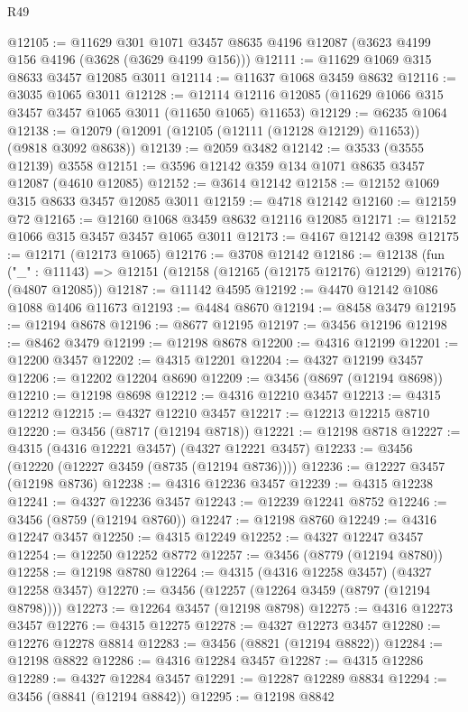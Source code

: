 \begin{lexlean}{R49}
\begin{coremodule}
@12105 := @11629
    @301
    @1071
    @3457
    @8635
    @4196
    @12087
    (@3623 @4199 @156 @4196 (@3628 (@3629 @4199 @156)))
@12111 := @11629 @1069 @315 @8633 @3457 @12085 @3011
@12114 := @11637 @1068 @3459 @8632
@12116 := @3035 @1065 @3011
@12128 := @12114 @12116 @12085 (@11629 @1066 @315 @3457 @3457 @1065 @3011 (@11650 @1065) @11653)
@12129 := @6235 @1064
@12138 := @12079 (@12091 (@12105 (@12111 (@12128 @12129) @11653)) (@9818 @3092 @8638))
@12139 := @2059 @3482
@12142 := @3533 (@3555 @12139) @3558
@12151 := @3596 @12142 @359 @134 @1071 @8635 @3457 @12087 (@4610 @12085)
@12152 := @3614 @12142
@12158 := @12152 @1069 @315 @8633 @3457 @12085 @3011
@12159 := @4718 @12142
@12160 := @12159 @72
@12165 := @12160 @1068 @3459 @8632 @12116 @12085
@12171 := @12152 @1066 @315 @3457 @3457 @1065 @3011
@12173 := @4167 @12142 @398
@12175 := @12171 (@12173 @1065)
@12176 := @3708 @12142
@12186 := @12138
    (fun ("_" : @11143) => @12151 (@12158 (@12165 (@12175 @12176) @12129) @12176) (@4807 @12085))
@12187 := @11142 @4595
@12192 := @4470 @12142 @1086 @1088 @1406 @11673
@12193 := @4484 @8670
@12194 := @8458 @3479
@12195 := @12194 @8678
@12196 := @8677 @12195
@12197 := @3456 @12196
@12198 := @8462 @3479
@12199 := @12198 @8678
@12200 := @4316 @12199
@12201 := @12200 @3457
@12202 := @4315 @12201
@12204 := @4327 @12199 @3457
@12206 := @12202 @12204 @8690
@12209 := @3456 (@8697 (@12194 @8698))
@12210 := @12198 @8698
@12212 := @4316 @12210 @3457
@12213 := @4315 @12212
@12215 := @4327 @12210 @3457
@12217 := @12213 @12215 @8710
@12220 := @3456 (@8717 (@12194 @8718))
@12221 := @12198 @8718
@12227 := @4315 (@4316 @12221 @3457) (@4327 @12221 @3457)
@12233 := @3456 (@12220 (@12227 @3459 (@8735 (@12194 @8736))))
@12236 := @12227 @3457 (@12198 @8736)
@12238 := @4316 @12236 @3457
@12239 := @4315 @12238
@12241 := @4327 @12236 @3457
@12243 := @12239 @12241 @8752
@12246 := @3456 (@8759 (@12194 @8760))
@12247 := @12198 @8760
@12249 := @4316 @12247 @3457
@12250 := @4315 @12249
@12252 := @4327 @12247 @3457
@12254 := @12250 @12252 @8772
@12257 := @3456 (@8779 (@12194 @8780))
@12258 := @12198 @8780
@12264 := @4315 (@4316 @12258 @3457) (@4327 @12258 @3457)
@12270 := @3456 (@12257 (@12264 @3459 (@8797 (@12194 @8798))))
@12273 := @12264 @3457 (@12198 @8798)
@12275 := @4316 @12273 @3457
@12276 := @4315 @12275
@12278 := @4327 @12273 @3457
@12280 := @12276 @12278 @8814
@12283 := @3456 (@8821 (@12194 @8822))
@12284 := @12198 @8822
@12286 := @4316 @12284 @3457
@12287 := @4315 @12286
@12289 := @4327 @12284 @3457
@12291 := @12287 @12289 @8834
@12294 := @3456 (@8841 (@12194 @8842))
@12295 := @12198 @8842

\end{coremodule}
\end{lexlean}
